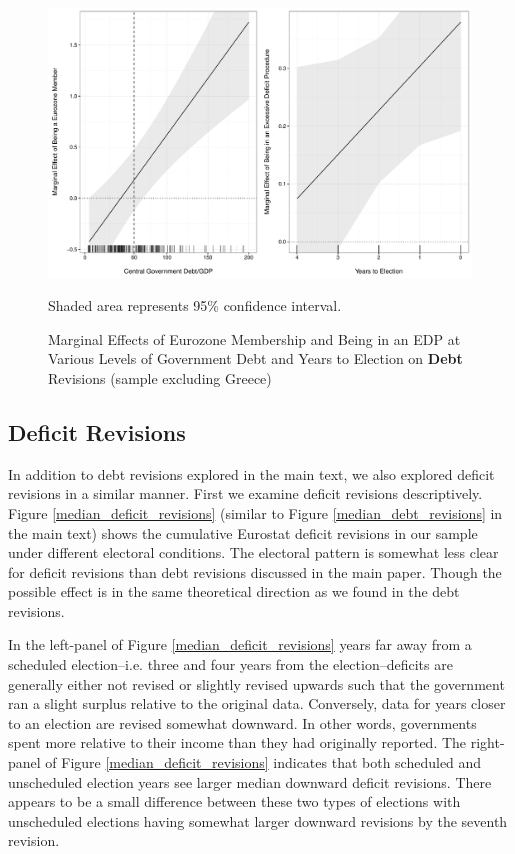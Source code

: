 \documentclass[]{article}
\begin{document}
\begin{figure}[H]
    \caption{Marginal Effects of Eurozone Membership and Being in an EDP at Various Levels of Government Debt and Years to Election on \textbf{Debt} Revisions (sample excluding Greece)}
    \label{me_no_greece_edp_timing}

    \begin{center}
        \includegraphics[scale=0.5]{figures/edp_debt_elect_me_nogr.pdf}
    \end{center}

	{\scriptsize{Shaded area represents 95\% confidence interval.}}

\end{figure}

\subsection*{Deficit Revisions}

In addition to debt revisions explored in the main text, we also explored deficit revisions in a similar manner. First we examine deficit revisions descriptively. Figure \ref{median_deficit_revisions} (similar to Figure \ref{median_debt_revisions} in the main text) shows the cumulative Eurostat deficit revisions in our sample under different electoral conditions. The electoral pattern is somewhat less clear for deficit revisions than debt revisions discussed in the main paper. Though the possible effect is in the same theoretical direction as we found in the debt revisions.

In the left-panel of Figure \ref{median_deficit_revisions} years far away from a scheduled election--i.e. three and four years from the election--deficits are generally either not revised or slightly revised upwards such that the government ran a slight surplus relative to the original data. Conversely, data for years closer to an election are revised somewhat downward. In other words, governments spent more relative to their income than they had originally reported. The right-panel of Figure \ref{median_deficit_revisions} indicates that both scheduled and unscheduled election years see larger median downward deficit revisions. There appears to be a small difference between these two types of elections with unscheduled elections having somewhat larger downward revisions by the seventh revision.
\end{document}
